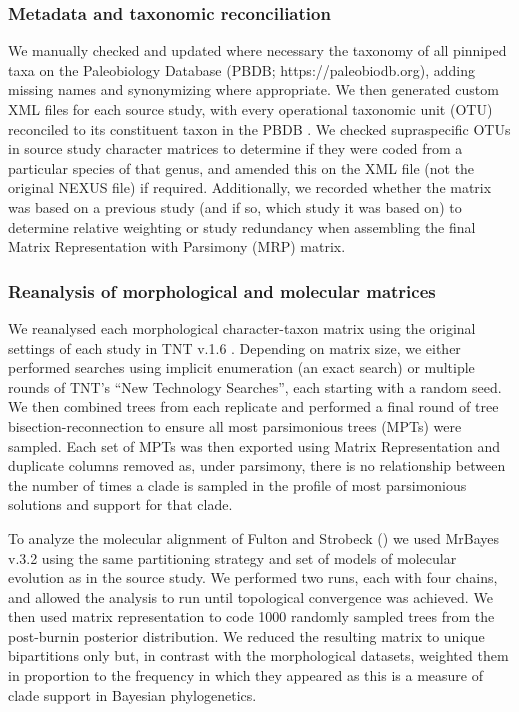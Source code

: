 \documentclass[a4paper, 12pt]{article}
\begin{document}
\begin{landscape}
\subsubsection{Metadata and taxonomic reconciliation} 

We manually checked and updated where necessary the taxonomy of all pinniped taxa on the Paleobiology Database (PBDB; https://paleobiodb.org), adding missing names and synonymizing where appropriate. We then generated custom XML files for each source study, with every operational taxonomic unit (OTU) reconciled to its constituent taxon in the PBDB \citep{peters2016paleobiology}. We checked supraspecific OTUs in source study character matrices to determine if they were coded from a particular species of that genus, and amended this on the XML file (not the original NEXUS file) if required. Additionally, we recorded whether the matrix was based on a previous study (and if so, which study it was based on) to determine relative weighting or study redundancy when assembling the final Matrix Representation with Parsimony (MRP) matrix.

\subsubsection{Reanalysis of morphological and molecular matrices} 

We reanalysed each morphological character-taxon matrix using the original settings of each study in TNT v.1.6 \citep{goloboff2008tnt}. Depending on matrix size, we either performed searches using implicit enumeration (an exact search) or multiple rounds of TNT’s “New Technology Searches”, each starting with a random seed. We then combined trees from each replicate and performed a final round of tree bisection-reconnection to ensure all most parsimonious trees (MPTs) were sampled. Each set of MPTs was then exported using Matrix Representation and duplicate columns removed as, under parsimony, there is no relationship between the number of times a clade is sampled in the profile of most parsimonious solutions and support for that clade. 
 
To analyze the molecular alignment of Fulton and Strobeck (\citeyear{fulton2010multiple}) we used MrBayes v.3.2 \citep{ronquist2012mrbayes} using the same partitioning strategy and set of models of molecular evolution as in the source study. We performed two runs, each with four chains, and allowed the analysis to run until topological convergence was achieved. We then used matrix representation to code 1000 randomly sampled trees from the post-burnin posterior distribution. We reduced the resulting matrix to unique bipartitions only but, in contrast with the morphological datasets, weighted them in proportion to the frequency in which they appeared as this is a measure of clade support in Bayesian phylogenetics.


\end{landscape}
\end{document}
